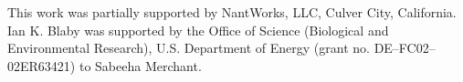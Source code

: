 \documentclass[aps,pra,reprint,superscriptaddress]{revtex4-1}
\begin{document}
%



\begin{acknowledgments}
This work was partially supported by NantWorks, LLC, Culver City, California. Ian K. Blaby was supported by the Office of Science (Biological and Environmental Research), U.S. Department of Energy (grant no. DE–FC02–02ER63421) to Sabeeha Merchant.
\end{acknowledgments}


\end{document}
